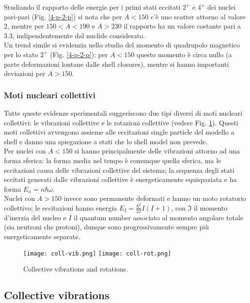 Studiando il rapporto delle energie per i primi stati eccitati $ 2^+ $ e $ 4^+ $ dei nuclei pari-pari (Fig. \ref{4-p-2-p}) si nota che per $ A < 150 $ c'è uno scatter attorno al valore 2, mentre per $ 150 < A < 190 $ e $ A > 230 $ il rapporto ha un valore costante pari a 3.3, indipendentemente dal nuclide considerato.\\
Un trend simile si evidenzia nello studio del momento di quadrupolo magnetico per lo stato $ 2^+ $ (Fig. \ref{4-p-2-p}): per $ A < 150 $ questo momento è circa nullo (a parte deformazioni lontane dalle shell closures), mentre si hanno importanti deviazioni per $ A > 150 $.

\subsubsection{Moti nucleari collettivi}

Tutte queste evidenze sperimentali suggeriscono due tipi diversi di moti nucleari collettivi: le vibrazioni collettive e le rotazioni collettive (vedere Fig. \ref{coll}). Questi moti collettivi avvengono assieme alle eccitazioni single particle del modello a shell e danno una spiegazione a stati che lo shell model non prevede.\\
Per nuclei con $ A < 150 $ si hanno principalmente delle vibrazioni attorno ad una forma sferica: la forma media nel tempo è comunque quella sferica, ma le eccitazioni causa delle vibrazioni collettive del sistema; la sequenza degli stati eccitati generati dalle vibrazioni collettive è energeticamente equispaziata e ha forma $ E_n = n \hbar \omega $.\\
Nuclei con $ A > 150 $ invece sono permanente deformati e hanno un moto rotatorio collettivo; le eccitazioni hanno energia $ E_{I} = \frac{\hbar^2}{2\mathfrak{I}} I (I + 1) $, con $ \mathfrak{I} $ il momento d'inerzia del nucleo e $ I $ il quantum number associato al momento angolare totale (sia neutroni che protoni), dunque sono progressivamente sempre più energeticamente separate.

\begin{figure}[!t]
	\centering
	\texttt{[image: coll-vib.png]}
	\texttt{[image: coll-rot.png]}
	\caption{Collective vibrations and rotations.}
	\label{coll}
\end{figure}

\subsection{Collective vibrations}

